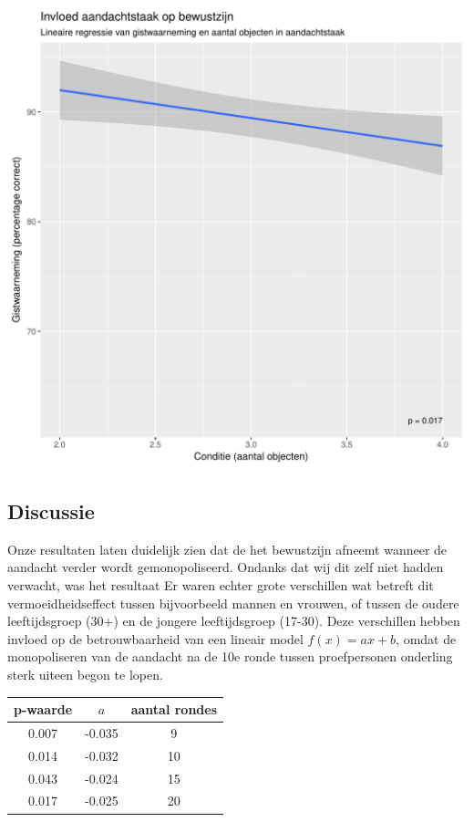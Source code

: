 \documentclass[a0,portrait]{a0poster}
\begin{document}
\begin{multicols}{3}
\begin{center}
\vspace{1cm}
	\includegraphics[width=0.8\linewidth]{lineaireRegressie.pdf}
\end{center}
\subsection*{Discussie}
Onze resultaten laten duidelijk zien dat de het bewustzijn afneemt wanneer de aandacht verder wordt gemonopoliseerd. Ondanks dat wij dit zelf niet hadden verwacht, was het resultaat 
 Er waren echter grote verschillen wat betreft dit vermoeidheidseffect tussen bijvoorbeeld mannen en vrouwen, of tussen de oudere leeftijdsgroep (30+) en de jongere leeftijdsgroep (17-30). Deze verschillen hebben invloed op de betrouwbaarheid van een lineair model $f(x)=a x+b$, omdat de monopoliseren van de aandacht na de 10e ronde tussen proefpersonen onderling sterk uiteen begon te lopen.
 \begin{center}
\begin{tabular}{c c c}
	\hline
	p-waarde & $a$ & aantal rondes\\
	\hline
	0.007 & -0.035 & 9\\
	0.014 & -0.032 & 10\\
	0.043 & -0.024 & 15\\
	0.017 & -0.025 & 20\\
	\hline
\end{tabular}
 \end{center}


\end{multicols}
\end{document}
